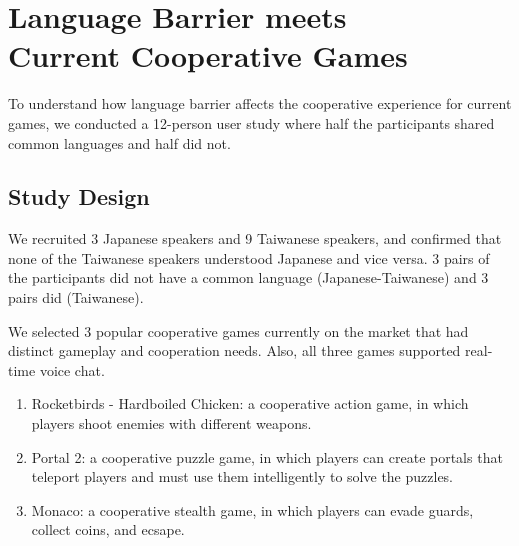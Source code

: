\section{Language Barrier meets\\ Current Cooperative Games}


To understand how language barrier affects the cooperative experience for current games, we conducted a 12-person user study where half the participants shared common languages and half did not. 

\subsection{Study Design}

We recruited 3 Japanese speakers and 9 Taiwanese speakers, and confirmed that none of the Taiwanese speakers understood Japanese and vice versa. 3 pairs of the participants did not have a common language (Japanese-Taiwanese) and 3 pairs did (Taiwanese).

We selected 3 popular cooperative games currently on the market that had distinct gameplay and cooperation needs. Also, all three games supported real-time voice chat. 
\begin{enumerate}
    \item Rocketbirds - Hardboiled Chicken: a cooperative action game, in which players shoot enemies with different weapons.
    
    \item Portal 2: a cooperative puzzle game, in which players can create portals that teleport players and must use them intelligently to solve the puzzles.
    
    \item Monaco: a cooperative stealth game, in which players can evade guards, collect coins, and ecsape.
\end{enumerate}

